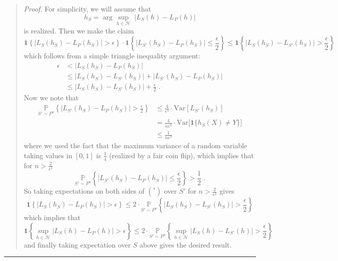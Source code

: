 \documentclass[]{article}
\begin{document}
\begin{quote}
\emph{Proof.} For simplicity, we will assume that \[
h_S = \arg\sup_{h\in \mathcal{H}}\; |L_S(h) - L_P(h)|
\] is realized. Then we make the claim \[
\mathbf{1}\left\{ |L_S(h_S) - L_P(h_S)| > \epsilon\right\} \cdot \mathbf{1}\left\{ |L_{S'}(h_S) - L_{P}(h_S)| \le \frac{\epsilon}{2}\right\} \le \mathbf{1}\left\{  |L_S(h_S) - L_{S'}(h_S)| > \frac{\epsilon}{2}\right\} \tag{*}
\] which follows from a simple triangle inequality argument: \[
\begin{align*}
\epsilon &<  |L_S(h_S) - L_P(h_S)| \\[5px]
&\le |L_S(h_S) - L_{S'}(h_S)| + |L_{S'}(h_S) - L_P(h_S)| \\[5px]
&\le  |L_S(h_S) - L_{S'}(h_S)| + \frac{\epsilon}{2}\;.
\end{align*}
\] Now we note that \[
\begin{align*}
\underset{S'\sim P^n}{\mathbb{P}}\left\{ |L_{S'}(h_S) - L_{P}(h_S)| > \frac{\epsilon}{2}\right\}
&\le \frac{4}{\epsilon^2}\cdot \text{Var}\left[ L_{S'}(h_S)\right] \\[5px]
&= \frac{4}{n\epsilon^2}\cdot \text{Var}\big[\mathbf{1}\{h_S(X)\ne Y\}\big] \\[5px] 
&\le \frac{1}{n\epsilon^2}
\end{align*}
\] where we used the fact that the maximum variance of a random variable
taking values in \([0,1]\) is \(\frac{1}{4}\) (realized by a fair coin
flip), which implies that for \(n > \frac{2}{\epsilon^2}\) \[
\underset{S'\sim P^n}{\mathbb{P}}\left\{ |L_{S'}(h_S) - L_{P}(h_S)| \le \frac{\epsilon}{2}\right\} > \frac{1}{2}\;.
\] So taking expectations on both sides of \((^*)\) over \(S'\) for
\(n > \frac{2}{\epsilon^2}\) gives \[
\mathbf{1}\left\{ |L_S(h_S) - L_P(h_S)| > \epsilon\right\} \le 2 \cdot \underset{S'\sim P^n}{\mathbb{P}}\left\{ |L_S(h_S) - L_{S'}(h_S)| > \frac{\epsilon}{2}\right\}
\] which implies that \[
\mathbf{1}\left\{ \sup_{h\in \mathcal{H}} |L_S(h) - L_P(h)| > \epsilon\right\} \le 2 \cdot \underset{S'\sim P^n}{\mathbb{P}}\left\{ \sup_{h\in \mathcal{H}} |L_S(h) - L_{S'}(h)| > \frac{\epsilon}{2}\right\}
\] and finally taking expectation over \(S\) above gives the desired
result.
\end{quote}

\begin{center}\rule{0.5\linewidth}{\linethickness}\end{center}
\end{document}
